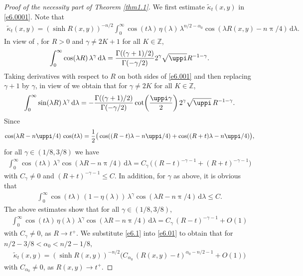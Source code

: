 \documentclass[a4paper,12pt]{amsart}
\numberwithin{equation}{section}
\theoremstyle{definition}
\theoremstyle{remark}
\numberwithin{theorem}{section}
\renewcommand{\d}{\mathrm{d}}
\begin{document}
\begin{proof}[Proof of the necessity part of Theorem \ref{thm1.1}]
We first estimate $\widetilde{\kappa}_t(x,y)$ in \eqref{e6.0001}. Note that
\begin{align}\label{e6.01}
\widetilde{\kappa}_t(x,y)=(\sinh R(x,y))^{-n/2}\int_0^\infty\cos(t\lambda)\,\eta(\lambda)\, \lambda^{n/2-\alpha_0} \cos(\lambda R(x,y)-n\uppi/4)\,\d\lambda.
\end{align}
In view of \cite[Theorem 2.4.6]{Gr2}, for $R>0$ and $\gamma\ne 2K+1$ for all $K\in\mathbb{Z}$,
\begin{align}\label{e6.001}
\int_0^\infty \cos(\lambda R)\,\lambda^\gamma\,\d\lambda
={\Gamma((\gamma+1)/2)\over \Gamma(-\gamma/2)}2^{\gamma}\sqrt{\uppi} R^{-1-\gamma}.
\end{align}
Taking derivatives with respect to $R$ on both sides of \eqref{e6.001} and then replacing $\gamma +1$ by $\gamma$, in view of \cite[(6) and (7) on p. 3]{Er} we obtain that for $\gamma\ne 2K$ for all $K\in\mathbb{Z}$,
\begin{align*}
\int_0^\infty \sin(\lambda R)\,\lambda^{\gamma}\,\d\lambda
=-{\Gamma((\gamma+1)/2)\over \Gamma(-\gamma/2)}\cot\!\left({\uppi\gamma\over 2}\right)2^\gamma\sqrt{\uppi} \,R^{-1-\gamma}.
\end{align*}
Since
\begin{align*}
\cos(\lambda R-n\uppi/4)\,\cos(t\lambda)={1\over 2}\big(\cos((R-t)\lambda-n\uppi/4)+\cos((R+t)\lambda-n\uppi/4)\big),
\end{align*}
for all $\gamma\in (1/8,3/8)$ we have
\begin{align*}
\int_0^\infty \cos(t\lambda) \, \lambda^\gamma \cos(\lambda R-n\uppi/4)\,\d \lambda=C_\gamma\, \big((R-t)^{-\gamma-1}+(R+t)^{-\gamma-1}\big)
\end{align*}
with $C_\gamma\ne 0$ and $(R+t)^{-\gamma-1}\leq C$. In addition, for $\gamma$ as above, it is obvious that
\begin{align*}
\int_0^\infty \cos(t\lambda) \,(1-\eta(\lambda))\, \lambda^\gamma \cos(\lambda R-n\uppi/4)\,\d \lambda\leq C.
\end{align*}
The above estimates show that for all $\gamma\in (1/8,3/8)$, 
\begin{align}\label{e6.1}
\int_0^\infty \cos(t\lambda) \,\eta(\lambda)\, \lambda^\gamma\cos(\lambda R-n\uppi/4)\,\d \lambda= C_\gamma \,(R-t)^{-\gamma-1}+O(1)
\end{align} 
with $C_\gamma\ne 0$, as $R\to t^+$. We substitute \eqref{e6.1} into \eqref{e6.01} to obtain that for $n/2-3/8<\alpha_0<n/2-1/8,$
\begin{align}\label{e6.2}
\widetilde{\kappa}_t(x,y)=(\sinh R(x,y))^{-n/2}\big(C_{\alpha_0}\, (R(x,y)-t)^{\alpha_0-n/2-1}+O(1)\big)
\end{align}
with $C_{\alpha_0}\ne 0$, as $R(x,y)\to t^+$. 


\end{proof}
\end{document}
